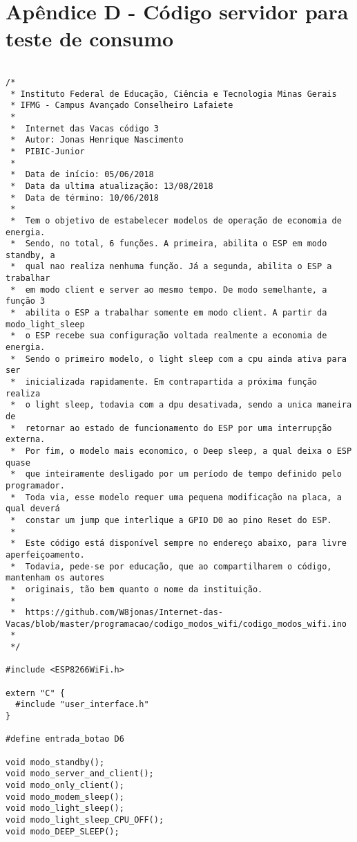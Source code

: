 \newpage
\section{Apêndice D - Código servidor para teste de consumo}
\label{sc:apendice_d_}

\begin{lstlisting}

/*
 * Instituto Federal de Educação, Ciência e Tecnologia Minas Gerais
 * IFMG - Campus Avançado Conselheiro Lafaiete 
 * 
 *  Internet das Vacas código 3
 *  Autor: Jonas Henrique Nascimento
 *  PIBIC-Junior
 * 
 *  Data de início: 05/06/2018
 *  Data da ultima atualização: 13/08/2018
 *  Data de término: 10/06/2018
 *  
 *  Tem o objetivo de estabelecer modelos de operação de economia de energia.
 *  Sendo, no total, 6 funções. A primeira, abilita o ESP em modo standby, a 
 *  qual nao realiza nenhuma função. Já a segunda, abilita o ESP a trabalhar
 *  em modo client e server ao mesmo tempo. De modo semelhante, a função 3
 *  abilita o ESP a trabalhar somente em modo client. A partir da modo_light_sleep
 *  o ESP recebe sua configuração voltada realmente a economia de energia. 
 *  Sendo o primeiro modelo, o light sleep com a cpu ainda ativa para ser 
 *  inicializada rapidamente. Em contrapartida a próxima função realiza
 *  o light sleep, todavia com a dpu desativada, sendo a unica maneira de
 *  retornar ao estado de funcionamento do ESP por uma interrupção externa.
 *  Por fim, o modelo mais economico, o Deep sleep, a qual deixa o ESP quase
 *  que inteiramente desligado por um período de tempo definido pelo programador.
 *  Toda via, esse modelo requer uma pequena modificação na placa, a qual deverá
 *  constar um jump que interlique a GPIO D0 ao pino Reset do ESP.
 * 
 *  Este código está disponível sempre no endereço abaixo, para livre aperfeiçoamento. 
 *  Todavia, pede-se por educação, que ao compartilharem o código, mantenham os autores
 *  originais, tão bem quanto o nome da instituição.
 *  
 *  https://github.com/W8jonas/Internet-das-Vacas/blob/master/programacao/codigo_modos_wifi/codigo_modos_wifi.ino
 *  
 */

#include <ESP8266WiFi.h>

extern "C" {
  #include "user_interface.h"
}

#define entrada_botao D6

void modo_standby();
void modo_server_and_client();
void modo_only_client();
void modo_modem_sleep();
void modo_light_sleep();
void modo_light_sleep_CPU_OFF();
void modo_DEEP_SLEEP();


\end{lstlisting}
